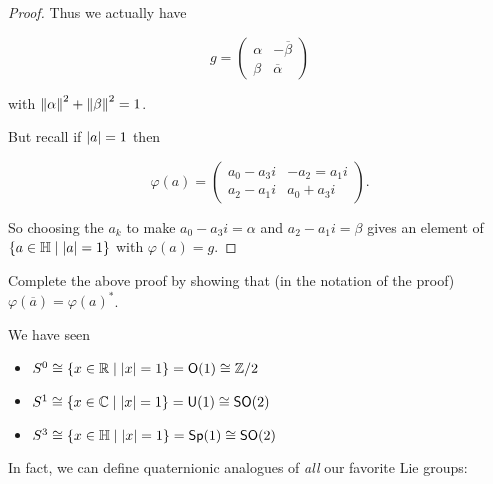 \documentclass[../main.tex]{subfiles}
\begin{document}
\begin{proof}
  Thus we actually have 

  \[ g = \begin{pmatrix} \alpha & - \overline{\beta} \\ \beta & \overline{\alpha} \end{pmatrix} \]

  with $\left \lVert \alpha \right \rVert^2 + \left \lVert \beta \right \rVert^2 = 1$.

  But recall if $\left \lvert a \right \rvert = 1$ then

  \[
    \varphi(a) 
    = \begin{pmatrix} a_0 - a_3 i & -a_2 = a_1 i \\ a_2 - a_1 i & a_0 + a_3 i \end{pmatrix}.
  \]

  So choosing the $a_k$ to make $a_0 - a_3 i = \alpha$ and
  $a_2 - a_1 i = \beta$ gives an element of $\{ a \in \mathbb{H} \mid \left \lvert a \right \rvert = 1 \}$
  with $\varphi(a) = g$.
\end{proof}

\begin{ExerciseList}
  \Exercise Complete the above proof by showing that 
  (in the notation of the proof) $\varphi(\overline{a}) = \varphi(a)^*$.
\end{ExerciseList}

We have seen 

\begin{itemize}
  \item $S^0 \cong \{ x \in \mathbb{R} \mid \left \lvert x \right \rvert = 1 \} = \mathsf{O}(1) \cong \mathbb{Z} / 2$  
  \item $S^1 \cong \{ x \in \mathbb{C} \mid \left \lvert x \right \rvert = 1 \} = \mathsf{U}(1) \cong \mathsf{SO}(2)$
  \item $S^3 \cong \{ x \in \mathbb{H} \mid \left \lvert x \right \rvert = 1 \} = \mathsf{Sp}(1) \cong \mathsf{SO}(2)$
\end{itemize}


In fact, we can define quaternionic analogues of \emph{all} our favorite Lie
groups:


\end{document}
